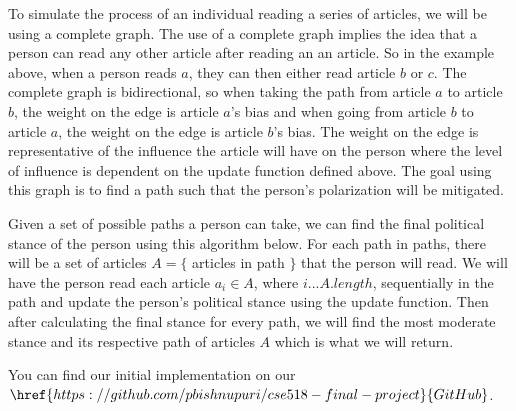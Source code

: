 \documentclass[11pt,reqno]{proc}
\begin{document}
To simulate the process of an individual reading a series of articles, we will be using a complete graph. The use of a complete graph implies the idea that a person can read any other article after reading an an article. So in the example above, when a person reads $a$, they can then either read article $b$ or $c$. The complete graph is bidirectional, so when taking the path from article $a$ to article $b$, the weight on the edge is article $a$'s bias and when going from article $b$ to article $a$, the weight on the edge is article $b$'s bias. The weight on the edge is representative of the influence the article will have on the person where the level of influence is dependent on the update function defined above. The goal using this graph is to find a path such that the person's polarization will be mitigated. 

Given a set of possible paths a person can take, we can find the final political stance of the person using this algorithm below. For each path in paths, there will be a set of articles $A = \{$ articles in path $\}$ that the person will read. We will have the person read each article $a_i \in A$, where $i...A.length$, sequentially in the path and update the person's political stance using the update function. Then after calculating the final stance for every path, we will find the most moderate stance and its respective path of articles $A$ which is what we will return. 

You can find our initial implementation on our $\href{https://github.com/pbishnupuri/cse518-final-project}{GitHub}$.

\vspace{6mm}
\end{document}
